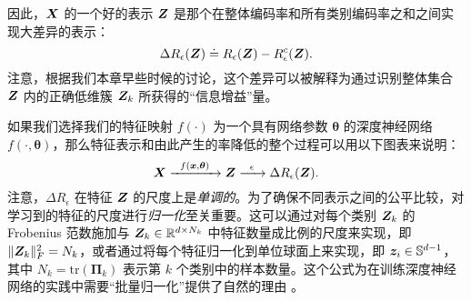 \documentclass[../../book-main_zh.tex]{subfiles}
\begin{document}

因此，$\bm{X}$ 的一个好的表示 $\bm{Z}$ 是那个在整体编码率和所有类别编码率之和之间实现大差异的表示：
\begin{equation}
	\Delta R_{\epsilon}(\bm{Z}) \doteq R_{\epsilon}(\bm{Z}) - R_{\epsilon}^c(\bm{Z}).
	\label{chap4-eqn:coding-length-reduction}
\end{equation}
注意，根据我们本章早些时候的讨论，这个差异可以被解释为通过识别整体集合 $\bm{Z}$ 内的正确低维簇 $\bm{Z}_k$ 所获得的“信息增益”量。

如果我们选择我们的特征映射 $f(\cdot)$ 为一个具有网络参数 $\bm \theta$ 的深度神经网络 $f(\cdot,\bm \theta)$，那么特征表示和由此产生的率降低的整个过程可以用以下图表来说明：
\begin{equation}
	\bm{X}
	\xrightarrow{\hspace{2mm} f(\bm{x}, \bm \theta)\hspace{2mm}} \bm{Z}  \xrightarrow{\hspace{2mm} \epsilon \hspace{2mm}} \Delta R_{\epsilon}(\bm{Z}).
	\label{chap4-eqn:flow}
\end{equation}
注意，$\Delta R_{\epsilon}$ 在特征 $\bm{Z}$ 的尺度上是{\em 单调的}。为了确保不同表示之间的公平比较，对学习到的特征的尺度进行{\em 归一化}至关重要。这可以通过对每个类别 $\bm{Z}_k$ 的 Frobenius 范数施加与 $\bm{Z}_k \in \mathbb R^{d \times N_k}$ 中特征数量成比例的尺度来实现，即 $\|\bm{Z}_k\|_F^2 = N_k$，或者通过将每个特征归一化到单位球面上来实现，即 $\bm{z}_i \in \mathbb{S}^{d-1}$，其中 $N_k=\mathrm{tr}(\bm \Pi_k)$ 表示第 $k$ 个类别中的样本数量。这个公式为在训练深度神经网络的实践中需要“批量归一化”提供了自然的理由 \cite{ioffe2015batch}。%
\end{document}
